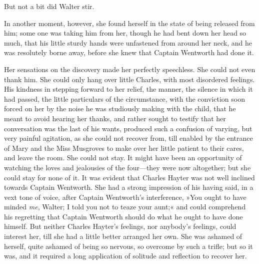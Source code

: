 But not a bit did Walter stir.

In another moment, however, she found herself in the state of being released from him; some one was taking him from her, though he had bent down her head so much, that his little sturdy hands were unfastened from around her neck, and he was resolutely borne away, before she knew that Captain Wentworth had done it.

Her sensations on the discovery made her perfectly speechless. She could not even thank him. She could only hang over little Charles, with most disordered feelings. His kindness in stepping forward to her relief, the manner, the silence in which it had passed, the little particulars of the circumstance, with the conviction soon forced on her by the noise he was studiously making with the child, that he meant to avoid hearing her thanks, and rather sought to testify that her conversation was the last of his wants, produced such a confusion of varying, but very painful agitation, as she could not recover from, till enabled by the entrance of Mary and the Miss Musgroves to make over her little patient to their cares, and leave the room. She could not stay. It might have been an opportunity of watching the loves and jealousies of the four—they were now altogether; but she could stay for none of it. It was evident that Charles Hayter was not well inclined towards Captain Wentworth. She had a strong impression of his having said, in a vext tone of voice, after Captain Wentworth's interference, »You ought to have minded \textit{me}, Walter; I told you not to teaze your aunt;« and could comprehend his regretting that Captain Wentworth should do what he ought to have done himself. But neither Charles Hayter's feelings, nor anybody's feelings, could interest her, till she had a little better arranged her own. She was ashamed of herself, quite ashamed of being so nervous, so overcome by such a trifle; but so it was, and it required a long application of solitude and reflection to recover her.